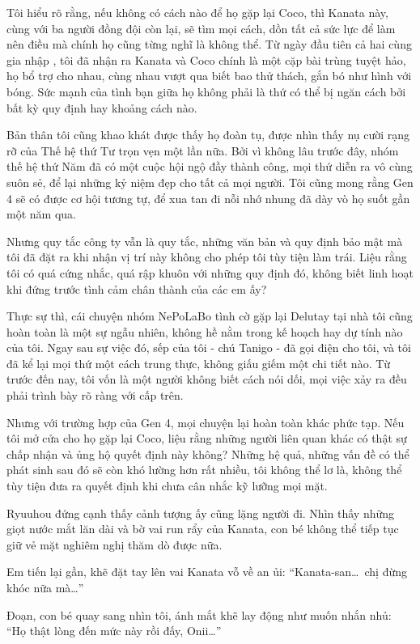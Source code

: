 \documentclass[../main.tex]{subfiles}
\begin{document}
Tôi hiểu rõ rằng, nếu không có cách nào để họ gặp lại Coco, thì Kanata này, cùng với ba người đồng đội còn lại, sẽ tìm mọi cách, dồn tất cả sức lực để làm nên điều mà chính họ cũng từng nghĩ là không thể. Từ ngày đầu tiên cả hai cùng gia nhập \hll, tôi đã nhận ra Kanata và Coco chính là một cặp bài trùng tuyệt hảo, họ bổ trợ cho nhau, cùng nhau vượt qua biết bao thử thách, gắn bó như hình với bóng. Sức mạnh của tình bạn giữa họ không phải là thứ có thể bị ngăn cách bởi bất kỳ quy định hay khoảng cách nào.

Bản thân tôi cũng khao khát được thấy họ đoàn tụ, được nhìn thấy nụ cười rạng rỡ của Thế hệ thứ Tư trọn vẹn một lần nữa. Bởi vì không lâu trước đây, nhóm thế hệ thứ Năm đã có một cuộc hội ngộ đầy thành công, mọi thứ diễn ra vô cùng suôn sẻ, để lại những kỷ niệm đẹp cho tất cả mọi người. Tôi cũng mong rằng Gen 4 sẽ có được cơ hội tương tự, để xua tan đi nỗi nhớ nhung đã dày vò họ suốt gần một năm qua.

Nhưng quy tắc công ty vẫn là quy tắc, những văn bản và quy định bảo mật mà tôi đã đặt ra khi nhận vị trí này không cho phép tôi tùy tiện làm trái. Liệu rằng tôi có quá cứng nhắc, quá rập khuôn với những quy định đó, không biết linh hoạt khi đứng trước tình cảm chân thành của các em ấy?

Thực sự thì, cái chuyện nhóm NePoLaBo tình cờ gặp lại Delutay tại nhà tôi cũng hoàn toàn là một sự ngẫu nhiên, không hề nằm trong kế hoạch hay dự tính nào của tôi. Ngay sau sự việc đó, sếp của tôi - chú Tanigo - đã gọi điện cho tôi, và tôi đã kể lại mọi thứ một cách trung thực, không giấu giếm một chi tiết nào. Từ trước đến nay, tôi vốn là một người không biết cách nói dối, mọi việc xảy ra đều phải trình bày rõ ràng với cấp trên.

Nhưng với trường hợp của Gen 4, mọi chuyện lại hoàn toàn khác phức tạp. Nếu tôi mở cửa cho họ gặp lại Coco, liệu rằng những người liên quan khác có thật sự chấp nhận và ủng hộ quyết định này không? Những hệ quả, những vấn đề có thể phát sinh sau đó sẽ còn khó lường hơn rất nhiều, tôi không thể lơ là, không thể tùy tiện đưa ra quyết định khi chưa cân nhắc kỹ lưỡng mọi mặt.

Ryuuhou đứng cạnh thấy cảnh tượng ấy cũng lặng người đi. Nhìn thấy những giọt nước mắt lăn dài và bờ vai run rẩy của Kanata, con bé không thể tiếp tục giữ vẻ mặt nghiêm nghị thăm dò được nữa.

Em tiến lại gần, khẽ đặt tay lên vai Kanata vỗ về an ủi: ``Kanata-san\dots\ chị đừng khóc nữa mà\dots''

Đoạn, con bé quay sang nhìn tôi, ánh mắt khẽ lay động như muốn nhắn nhủ: ``Họ thật lòng đến mức này rồi đấy, Onii\dots''
\end{document}
